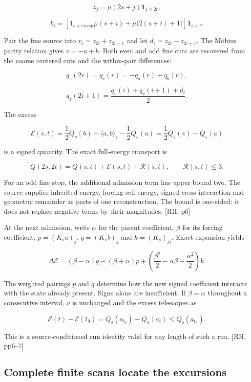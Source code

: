 \[
z_j=\mu(2s+j)\mathbf1_{j<2t},
\]

\[
b_i=\left[\mathbf1_{s+i\ \mathrm{even}}\mu(s+i)+\mu\bigl(2(s+i)+1\bigr)\right]\mathbf1_{i<t}.
\]

Pair the fine source into \(v_i=z_{2i}+z_{2i+1}\) and let \(d_i=z_{2i}-z_{2i+1}\). The Möbius parity relation gives \(v=-a+b\). Both even and odd fine cuts are recovered from the coarse centered cuts and the within-pair differences:

\[
q_z(2r)=q_v(r)=-q_a(r)+q_b(r),
\]

\[
q_z(2i+1)=\frac{q_v(i)+q_v(i+1)+d_i}{2}.
\]

The excess

\[
\mathcal E(s,t)=\frac12Q_s(b)-\langle a,b\rangle_s-\frac12Q_s(a)=\frac12Q_s(v)-Q_s(a)
\]

is a signed quantity. The exact full-energy transport is

\[
Q(2s,2t)=Q(s,t)+\mathcal E(s,t)+\mathcal R(s,t),\qquad\mathcal R(s,t)\le3.
\]

For an odd fine stop, the additional admission term has upper bound two. The source supplies inherited energy, forcing self energy, signed cross interaction and geometric remainder as parts of one reconstruction. The bound is one-sided; it does not replace negative terms by their magnitudes. {[}RH, p6{]}

At the next admission, write \(\alpha\) for the parent coefficient, \(\beta\) for its forcing coefficient, \(p=(K_sa)_j\), \(q=(K_sb)_j\) and \(k=(K_s)_{jj}\). Exact expansion yields

\[
\Delta\mathcal E=(\beta-\alpha)q-(\beta+\alpha)p+\left(\frac{\beta^2}{2}-\alpha\beta-\frac{\alpha^2}{2}\right)k.
\]

The weighted pairings \(p\) and \(q\) determine how the new signed coefficient interacts with the state already present. Signs alone are insufficient. If \(\beta=\alpha\) throughout a consecutive interval, \(v\) is unchanged and the excess telescopes as

\[
\mathcal E(t)-\mathcal E(t_0)=Q_s(a_{t_0})-Q_s(a_t)\le Q_s(a_{t_0}).
\]

This is a source-conditioned run identity valid for any length of such a run. {[}RH, pp6--7{]}

\subsection{Complete finite scans locate the excursions}\label{complete-finite-scans-locate-the-excursions}

